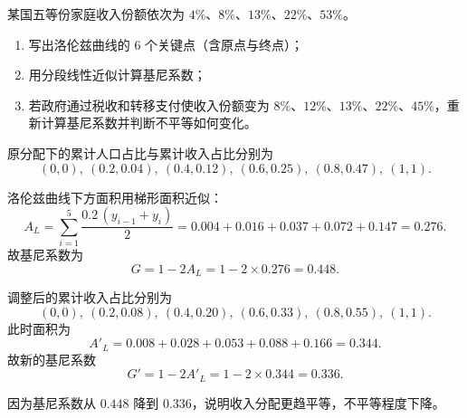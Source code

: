 \begin{question}
某国五等份家庭收入份额依次为 $4\%$、$8\%$、$13\%$、$22\%$、$53\%$。

\begin{enumerate}[label=(\arabic*),leftmargin=2.5em]
  \item 写出洛伦兹曲线的 6 个关键点（含原点与终点）；
  \item 用分段线性近似计算基尼系数；
  \item 若政府通过税收和转移支付使收入份额变为 $8\%$、$12\%$、$13\%$、$22\%$、$45\%$，重新计算基尼系数并判断不平等如何变化。
\end{enumerate}

\begin{solution}
原分配下的累计人口占比与累计收入占比分别为
\[
(0,0),\ (0.2,0.04),\ (0.4,0.12),\ (0.6,0.25),\ (0.8,0.47),\ (1,1).
\]

洛伦兹曲线下方面积用梯形面积近似：
\[
A_L=\sum_{i=1}^{5}\frac{0.2\,(y_{i-1}+y_i)}{2}
=0.004+0.016+0.037+0.072+0.147=0.276.
\]
故基尼系数为
\[
G=1-2A_L=1-2\times 0.276=0.448.
\]

调整后的累计收入占比分别为
\[
(0,0),\ (0.2,0.08),\ (0.4,0.20),\ (0.6,0.33),\ (0.8,0.55),\ (1,1).
\]
此时面积为
\[
A'_L=0.008+0.028+0.053+0.088+0.166=0.344.
\]
故新的基尼系数
\[
G'=1-2A'_L=1-2\times 0.344=0.336.
\]

因为基尼系数从 $0.448$ 降到 $0.336$，说明收入分配更趋平等，不平等程度下降。
\end{solution}
\end{question}

